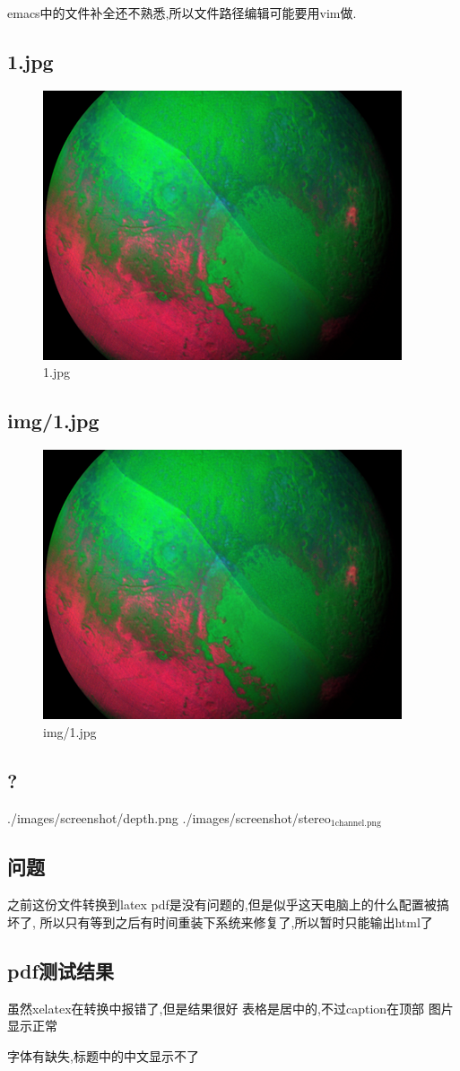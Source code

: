 \documentclass[nofonts]{ctexart}
\begin{document}
emacs中的文件补全还不熟悉,所以文件路径编辑可能要用vim做.
\subsection{1.jpg}
\label{sec:orgheadline5}
\begin{figure}[htb]
\centering
\includegraphics[width=.9\linewidth]{1.jpg}
\caption{\label{fig:orgparagraph2}
1.jpg}
\end{figure}
\subsection{img/1.jpg}
\label{sec:orgheadline6}
\begin{figure}[htb]
\centering
\includegraphics[width=.9\linewidth]{img/1.jpg}
\caption{\label{fig:orgparagraph3}
img/1.jpg}
\end{figure}
\subsection{?}
\label{sec:orgheadline7}
./images/screenshot/depth.png
./images/screenshot/stereo\(_{\text{1channel.png}}\)
\subsection{问题}
\label{sec:orgheadline8}
之前这份文件转换到latex pdf是没有问题的,但是似乎这天电脑上的什么配置被搞坏了,
所以只有等到之后有时间重装下系统来修复了,所以暂时只能输出html了
\subsection{pdf测试结果}
\label{sec:orgheadline9}
虽然xelatex在转换中报错了,但是结果很好
表格是居中的,不过caption在顶部
图片显示正常

字体有缺失,标题中的中文显示不了
\end{document}
